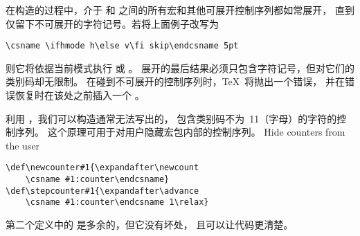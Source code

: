 \documentclass[letterpaper]{book}
\begin{document}
在构造的过程中，介于  和 
之间的所有宏和其他可展开控制序列都如常展开，
直到仅留下不可展开的字符记号。若将上面例子改写为
\begin{verbatim}
\csname \ifhmode h\else v\fi skip\endcsname 5pt
\end{verbatim}
则它将依据当前模式执行  或 。
展开的最后结果必须只包含字符记号，但对它们的类别码却无限制。
在碰到不可展开的控制序列时，\TeX\ 将抛出一个错误，
并在错误恢复时在该处之前插入一个 。

利用 ，我们可以构造通常无法写出的，
包含类别码不为~11（字母）的字符的控制序列。
这个原理可用于对用户隐藏宏包内部的控制序列。
\howto Hide counters from the user\par
\begin{example}
\begin{verbatim}
\def\newcounter#1{\expandafter\newcount
    \csname #1:counter\endcsname}
\def\stepcounter#1{\expandafter\advance
    \csname #1:counter\endcsname 1\relax}
\end{verbatim}
第二个定义中的  是多余的，但它没有坏处，
且可以让代码更清楚。
\end{example}
\end{document}
